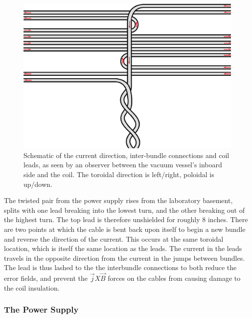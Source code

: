\begin{figure}
\includegraphics[width = \textwidth]{./figures/Coil_winding_schematic.png}\begin{flushleft}
\caption{Schematic of the current direction, inter-bundle connections and coil leads, as seen by an observer between the vacuum vessel's inboard side and the coil.  The toroidal direction is left/right, poloidal is up/down.}
\end{flushleft}

\label{coil_winding}
\end{figure}
The twisted pair from the power supply rises from the laboratory basement, splits with one lead breaking into the lowest turn, and the other breaking out of the highest turn.  The top lead is therefore unshielded for roughly 8 inches.  There are two points at which the cable is bent back upon itself to begin a new bundle and reverse the direction of the current.  This occurs at the same toroidal location, which is itself the same location as the leads.  The current in the leads travels in the opposite direction from the current in the jumps between bundles.  The lead is thus lashed to the the interbundle connections to both reduce the error fields, and prevent the $\vec{j} X \vec{B}$ forces on the cables from causing damage to the coil insulation.
\subsubsection{The Power Supply}

